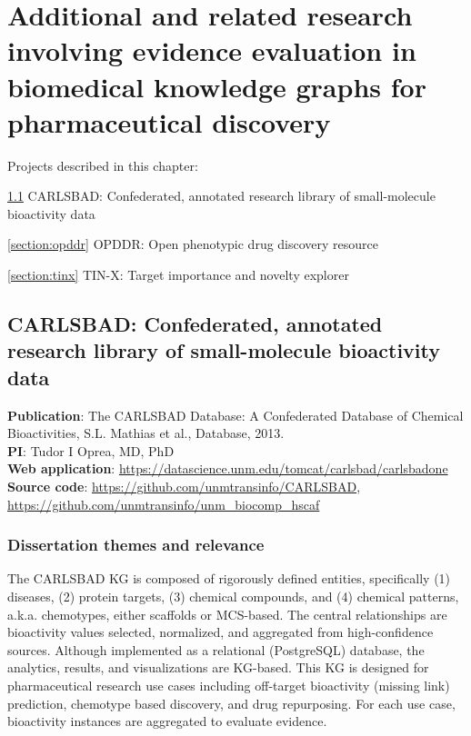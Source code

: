 \chapter{Additional and related research involving evidence evaluation in biomedical knowledge graphs for pharmaceutical discovery}


\vspace*{\fill}
Projects described in this chapter:


\noindent
\ref{section:carlsbad} CARLSBAD: Confederated, annotated research library of small-molecule bioactivity data

\noindent
\ref{section:opddr} OPDDR: Open phenotypic drug discovery resource

\noindent
\ref{section:tinx} TIN-X: Target importance and novelty explorer

\vspace*{\fill}


\newpage
\section{CARLSBAD: Confederated, annotated research library of 
small-molecule bioactivity data}
\label{section:carlsbad}

\textbf{Publication}: The CARLSBAD Database: A Confederated Database of Chemical Bioactivities, S.L. Mathias et al., Database, 2013\cite{Mathias2013-hj}.\\
\textbf{PI}: Tudor I Oprea, MD, PhD\\
\textbf{Web application}: \href{https://datascience.unm.edu/tomcat/carlsbad/carlsbadone}{https://datascience.unm.edu/tomcat/carlsbad/carlsbadone}\\
\textbf{Source code}: \href{https://github.com/unmtransinfo/CARLSBAD}{https://github.com/unmtransinfo/CARLSBAD},\\
\href{https://github.com/unmtransinfo/unm_biocomp_hscaf}{https://github.com/unmtransinfo/unm\_biocomp\_hscaf}

\subsection{Dissertation themes and relevance}

The CARLSBAD KG is composed of rigorously defined entities, specifically (1) diseases, (2) protein targets, (3) chemical compounds, and (4) chemical patterns, a.k.a. chemotypes, either scaffolds or MCS-based. The central relationships are bioactivity values selected, normalized, and aggregated from high-confidence sources. Although implemented as a relational (PostgreSQL) database, the analytics, results, and visualizations are KG-based. This KG is designed for pharmaceutical research use cases including off-target bioactivity (missing link) prediction, chemotype based discovery, and drug repurposing. For each use case, bioactivity instances are aggregated to evaluate evidence.

